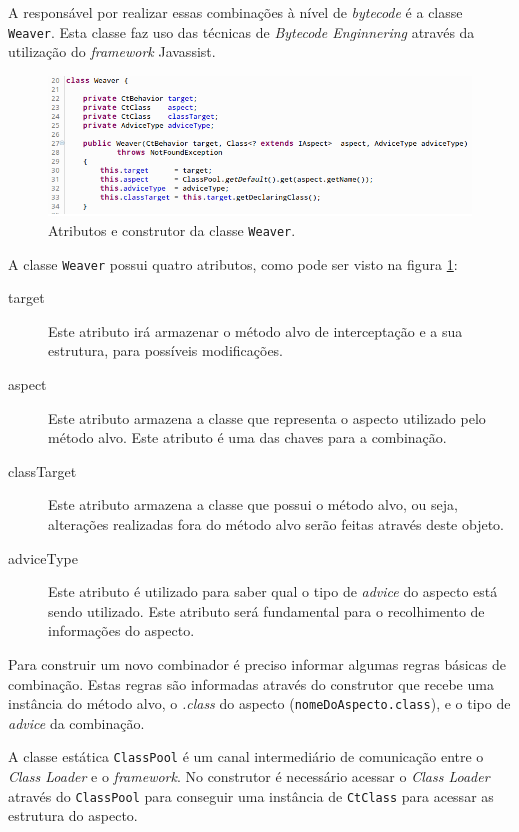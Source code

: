 \documentclass[tc,oneside]{iiufrgs}
\begin{document}
A responsável por realizar essas combinações à nível de \textit{bytecode} é a classe \texttt{Weaver}. Esta classe faz uso das técnicas de \textit{Bytecode Enginnering} através da utilização do \textit{framework} Javassist.

\begin{figure}[ht]
	\centering
	\includegraphics[scale=0.5]{figuras/implementacao/weaver.png}
	\caption{Atributos e construtor da classe \texttt{Weaver}.}
	\label{fig:weaver}
\end{figure}

A classe \texttt{Weaver} possui quatro atributos, como pode ser visto na figura \ref{fig:weaver}:

\begin{description}
\item [target] Este atributo irá armazenar o método alvo de interceptação e a sua estrutura, para possíveis modificações.
\item [aspect] Este atributo armazena a classe que representa o aspecto utilizado pelo método alvo. Este atributo é uma das chaves para a combinação.
\item [classTarget] Este atributo armazena a classe que possui o método alvo, ou seja, alterações realizadas fora do método alvo serão feitas através deste objeto.
\item [adviceType] Este atributo é utilizado para saber qual o tipo de \textit{advice} do aspecto está sendo utilizado. Este atributo será fundamental para o recolhimento de informações do aspecto.
\end{description}

Para construir um novo combinador é preciso informar algumas regras básicas de combinação. Estas regras são informadas através do construtor que recebe uma instância do método alvo, o \textit{.class} do aspecto (\texttt{nomeDoAspecto.class}), e o tipo de \textit{advice} da combinação.

A classe estática \texttt{ClassPool} é um canal intermediário de comunicação entre o \textit{Class Loader} e o \textit{framework}. No construtor é necessário acessar o \textit{Class Loader} através do \texttt{ClassPool} para conseguir uma instância de \texttt{CtClass} para acessar as estrutura do aspecto.
\end{document}
